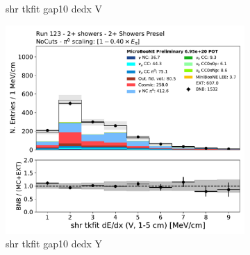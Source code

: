 \begin{figure}[H]
\begin{subfigure}{0.3\textwidth}
    \caption{shr tkfit gap10 dedx V}
    \end{subfigure}
    \begin{subfigure}{0.3\textwidth}
    \includegraphics[width=1.0\textwidth]{Sidebands/Figures/TwoShr_1e0pSel/Presel/shr_tkfit_gap10_dedx_V.pdf}
    \caption{shr tkfit gap10 dedx Y}
    \end{subfigure}
    \caption{} 
    \label{fig:HE_1eNp_1}
\end{figure}

